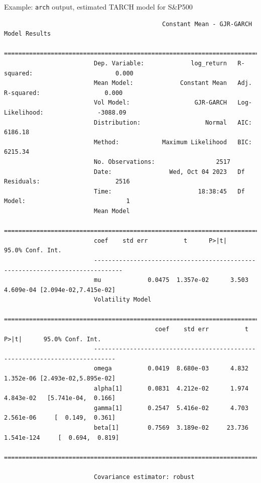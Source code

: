 \begin{frame}[fragile]
\begin{block}{Example: \texttt{arch} output, estimated TARCH model for S\&P500}
\tiny
\begin{verbatim}
                                            Constant Mean - GJR-GARCH Model Results                    
                         ==============================================================================
                         Dep. Variable:             log_return   R-squared:                       0.000
                         Mean Model:             Constant Mean   Adj. R-squared:                  0.000
                         Vol Model:                  GJR-GARCH   Log-Likelihood:               -3088.09
                         Distribution:                  Normal   AIC:                           6186.18
                         Method:            Maximum Likelihood   BIC:                           6215.34
                         No. Observations:                 2517
                         Date:                Wed, Oct 04 2023   Df Residuals:                     2516
                         Time:                        18:38:45   Df Model:                            1
                         Mean Model                                 
                         ==============================================================================
                         coef    std err          t      P>|t|      95.0% Conf. Int.
                         ------------------------------------------------------------------------------
                         mu             0.0475  1.357e-02      3.503  4.609e-04 [2.094e-02,7.415e-02]
                         Volatility Model                              
                         ==============================================================================
                                          coef    std err          t      P>|t|      95.0% Conf. Int.
                         ----------------------------------------------------------------------------
                         omega          0.0419  8.680e-03      4.832  1.352e-06 [2.493e-02,5.895e-02]
                         alpha[1]       0.0831  4.212e-02      1.974  4.843e-02   [5.741e-04,  0.166]
                         gamma[1]       0.2547  5.416e-02      4.703  2.561e-06     [  0.149,  0.361]
                         beta[1]        0.7569  3.189e-02     23.736 1.541e-124     [  0.694,  0.819]
                         ==============================================================================

                         Covariance estimator: robust
\end{verbatim}
	
\end{block}

\end{frame}

